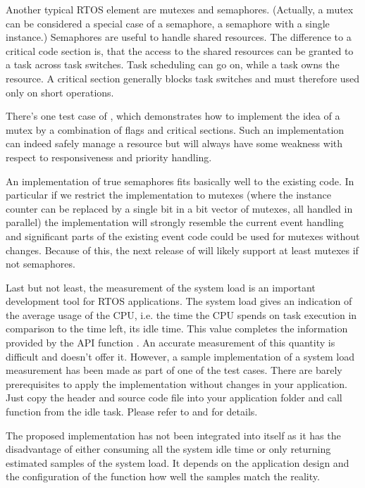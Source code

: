 Another typical RTOS element are mutexes and semaphores. (Actually, a
mutex can be considered a special case of a semaphore, a semaphore with a
single instance.) Semaphores are useful to handle shared resources. The
difference to a critical code section is, that the access to the shared
resources can be granted to a task across task switches. Task scheduling can
go on, while a task owns the resource. A critical section generally blocks
task switches and must therefore used only on short operations. 

There's one test case of \rtos{}, which demonstrates how to implement the
idea of a mutex by a combination of flags and critical sections. Such an
implementation can indeed safely manage a resource but will always have
some weakness with respect to responsiveness and priority handling.

An implementation of true semaphores fits basically well to the existing
code. In particular if we restrict the implementation to mutexes (where
the instance counter can be replaced by a single bit in a bit vector of
 mutexes, all handled in parallel) the implementation will
strongly resemble the current event handling and significant parts of the
existing event code could be used for mutexes without changes. Because of
this, the next release of \rtos{} will likely support at least mutexes if
not semaphores.

Last but not least, the measurement of the system load is an important
development tool for RTOS applications. The system load gives an
indication of the average usage of the CPU, i.e. the time the CPU spends
on task execution in comparison to the time left, its idle time. This
value completes the information provided by the API function
. An accurate measurement of this
quantity is difficult and \rtos{} doesn't offer it. However, a sample
implementation of a system load measurement has been made as part of one
of the test cases. There are barely prerequisites to apply the
implementation without changes in your \rtos{} application. Just copy the
header and source code file into your application folder and call function
 from the idle task. Please refer to
 and  for details.

The proposed implementation has not been integrated into \rtos{} itself as
it has the disadvantage of either consuming all the system idle time or
only returning estimated samples of the system load. It depends on the
application design and the configuration of the function how well the
samples match the reality.